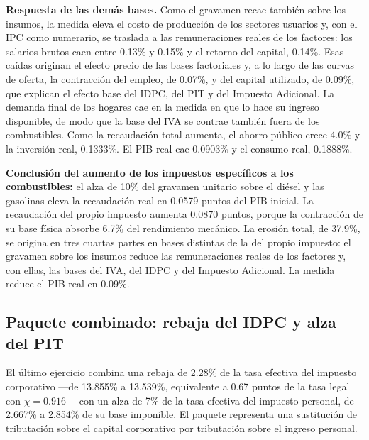 \documentclass[11pt]{article}
\begin{document}
\textbf{Respuesta de las demás bases.} Como el gravamen recae también sobre los insumos, la medida eleva el costo de producción de los sectores usuarios y, con el IPC como numerario, se traslada a las remuneraciones reales de los factores: los salarios brutos caen entre 0.13\% y 0.15\% y el retorno del capital, 0.14\%. Esas caídas originan el efecto precio de las bases factoriales y, a lo largo de las curvas de oferta, la contracción del empleo, de 0.07\%, y del capital utilizado, de 0.09\%, que explican el efecto base del IDPC, del PIT y del Impuesto Adicional. La demanda final de los hogares cae en la medida en que lo hace su ingreso disponible, de modo que la base del IVA se contrae también fuera de los combustibles. Como la recaudación total aumenta, el ahorro público crece 4.0\% y la inversión real, 0.1333\%. El PIB real cae 0.0903\% y el consumo real, 0.1888\%.

\textbf{Conclusión del aumento de los impuestos específicos a los combustibles:} el alza de 10\% del gravamen unitario sobre el diésel y las gasolinas eleva la recaudación real en 0.0579 puntos del PIB inicial. La recaudación del propio impuesto aumenta 0.0870 puntos, porque la contracción de su base física absorbe 6.7\% del rendimiento mecánico. La erosión total, de 37.9\%, se origina en tres cuartas partes en bases distintas de la del propio impuesto: el gravamen sobre los insumos reduce las remuneraciones reales de los factores y, con ellas, las bases del IVA, del IDPC y del Impuesto Adicional. La medida reduce el PIB real en 0.09\%.

\subsection{Paquete combinado: rebaja del IDPC y alza del PIT}
\label{sec:sim-comb}

El último ejercicio combina una rebaja de 2.28\% de la tasa efectiva del impuesto corporativo ---de 13.855\% a 13.539\%, equivalente a 0.67 puntos de la tasa legal con $\chi=0.916$--- con un alza de 7\% de la tasa efectiva del impuesto personal, de 2.667\% a 2.854\% de su base imponible. El paquete representa una sustitución de tributación sobre el capital corporativo por tributación sobre el ingreso personal.
\end{document}
